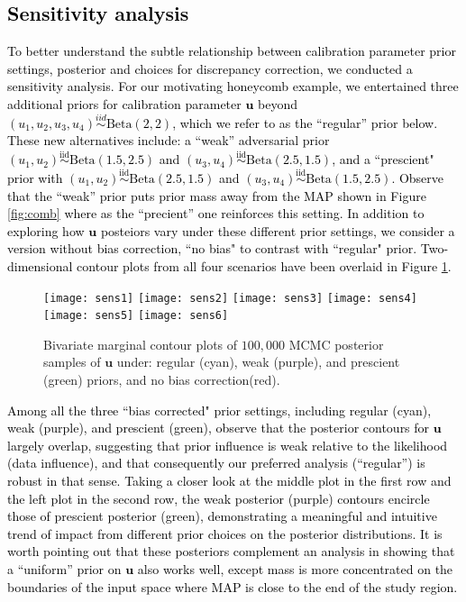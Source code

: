 \documentclass[12pt]{article}
\newcommand{\blunew}[1]{\textcolor{black}{#1}} %
\begin{document}
{\blunew{
\subsection{Sensitivity analysis}
\label{sec:sens}
To better understand the subtle relationship between calibration parameter
prior settings, posterior and choices for discrepancy correction, we 
conducted a sensitivity analysis.   For our motivating honeycomb example, we
entertained three additional priors for calibration parameter $\mathbf{u}$
beyond $(u_1, u_2, u_3, u_4) \overset{iid}{\sim} \text{Beta}(2, 2)$, which we
refer to as the ``regular'' prior below.  These new alternatives include: a
``weak'' adversarial prior  $(u_1, u_2)
\overset{\mathrm{iid}}{\sim} \text{Beta}(1.5, 2.5)$ and $ (u_3, u_4)
\overset{\mathrm{iid}}{\sim} \text{Beta}(2.5, 1.5)$, and a ``prescient" prior with
$(u_1, u_2) \overset{\mathrm{iid}}{\sim} \text{Beta}(2.5, 1.5)$ and $ (u_3, u_4)
\overset{\mathrm{iid}}{\sim} \text{Beta}(1.5, 2.5)$. Observe that the ``weak''
prior puts prior mass away from the MAP shown in Figure \ref{fig:comb}
where as the ``precient'' one reinforces this setting. In addition to
exploring how $\mathbf{u}$ posteiors vary under these different prior
settings,  we consider a version without bias correction, ``no bias" to contrast with
``regular" prior. Two-dimensional contour plots from all four scenarios have
been overlaid  in Figure \ref{fig:sens}.}

\begin{figure}[ht!]
\centering
\texttt{[image: sens1]}
\texttt{[image: sens2]}
\texttt{[image: sens3]}
\texttt{[image: sens4]}
\texttt{[image: sens5]}
\texttt{[image: sens6]}
\caption{Bivariate marginal contour plots of $100{,}000$ MCMC posterior samples of
 $\mathbf{u}$ under: regular (cyan),  weak (purple), and prescient (green)
 priors, and no bias correction(red). }
\label{fig:sens}
\end{figure}

\blunew{
Among all the three ``bias corrected" prior settings, including regular
(cyan), weak (purple),  and prescient (green),  observe that the posterior
contours for  $\mathbf{u}$ largely overlap, suggesting that prior influence is
weak relative to the likelihood (data influence), and that consequently our
preferred analysis (``regular'') is robust in that sense. Taking a closer look
at  the middle plot in the first row and the left plot in the second row, the
weak posterior (purple) contours encircle those of prescient posterior
(green), demonstrating a meaningful and intuitive trend of impact from
different prior choices on the posterior distributions.  It is worth pointing
out that these posteriors complement an analysis in \citep{Huang:2018} showing
that a ``uniform'' prior on $\mathbf{u}$ also works well, except mass is more
concentrated on the boundaries of the input space where MAP is close to the
end of the study region.
}

}
\end{document}
